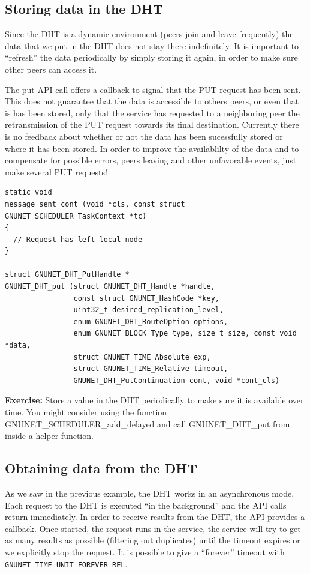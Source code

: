 \documentclass[10pt]{article}
\newcommand{\exercise}[1]{\noindent\begin{boxedminipage}{\textwidth}{\bf Exercise:} #1 \end{boxedminipage}}
\begin{document}
\subsection{Storing data in the DHT}
Since the DHT is a dynamic environment (peers join and leave frequently)
the data that we put in the DHT does not stay there indefinitely. It is
important to ``refresh'' the data periodically by simply storing it again,
in order to make sure other peers can access it.

The put API call offers a callback to signal that the PUT request has been
sent. This does not guarantee that the data is accessible to others peers,
or even that is has been stored, only that the service has requested to
a neighboring peer the retransmission of the PUT request towards its final
destination. Currently there is no feedback about whether or not the data
has been sucessfully stored or where it has been stored. In order to improve
the availablilty of the data and to compensate for possible errors, peers leaving
and other unfavorable events, just make several PUT requests!

\lstset{language=C}
\begin{lstlisting}
static void
message_sent_cont (void *cls, const struct GNUNET_SCHEDULER_TaskContext *tc)
{
  // Request has left local node
}

struct GNUNET_DHT_PutHandle *
GNUNET_DHT_put (struct GNUNET_DHT_Handle *handle,
                const struct GNUNET_HashCode *key,
                uint32_t desired_replication_level,
                enum GNUNET_DHT_RouteOption options,
                enum GNUNET_BLOCK_Type type, size_t size, const void *data,
                struct GNUNET_TIME_Absolute exp,
                struct GNUNET_TIME_Relative timeout,
                GNUNET_DHT_PutContinuation cont, void *cont_cls)
\end{lstlisting}

\exercise{Store a value in the DHT periodically to make sure it is available
over time. You might consider using the function GNUNET\_SCHEDULER\_add\_delayed and
call GNUNET\_DHT\_put from inside a helper function.}


\subsection{Obtaining data from the DHT}
As we saw in the previous example, the DHT works in an asynchronous mode.
Each request to the DHT is executed ``in the background'' and the API
calls return immediately. In order to receive results from the DHT, the
API provides a callback. Once started, the request runs in the service,
the service will try to get as many results as possible (filtering out
duplicates) until the timeout expires or we explicitly stop the request.
It is possible to give a ``forever'' timeout with
{\tt GNUNET\_TIME\_UNIT\_FOREVER\_REL}.
\end{document}
